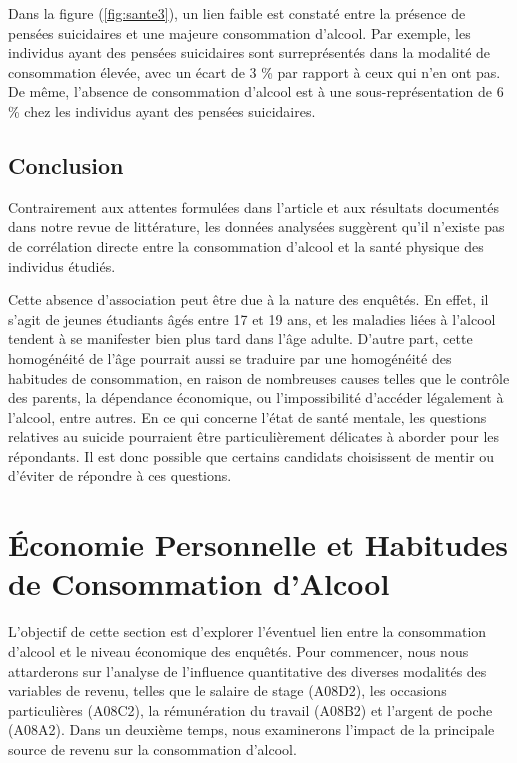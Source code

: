 \documentclass{article}
\begin{document}
Dans la figure (\ref{fig:sante3}), un lien faible est constaté entre la présence de pensées suicidaires et une majeure consommation d'alcool. Par exemple, les individus ayant des pensées suicidaires sont surreprésentés dans la modalité de consommation élevée, avec un écart de 3 \% par rapport à ceux qui n'en ont pas. De même, l'absence de consommation d'alcool est à une sous-représentation de 6 \% chez les individus ayant des pensées suicidaires.



\subsection{Conclusion}

Contrairement aux attentes formulées dans l'article \cite{article1} et aux résultats documentés dans notre revue de littérature, les données analysées suggèrent qu’il n’existe pas de corrélation directe entre la consommation d’alcool et la santé physique des individus étudiés. 

Cette absence d’association peut être due à la nature des enquêtés. En effet, il s'agit de jeunes étudiants âgés entre 17 et 19 ans, et les maladies liées à l'alcool tendent à se manifester bien plus tard dans l'âge adulte. D'autre part, cette homogénéité de l'âge pourrait aussi se traduire par une homogénéité des habitudes de consommation, en raison de nombreuses causes telles que le contrôle des parents, la dépendance économique, ou l'impossibilité d'accéder légalement à l'alcool, entre autres. En ce qui concerne l'état de santé mentale, les questions relatives au suicide pourraient être particulièrement délicates à aborder pour les répondants. Il est donc possible que certains candidats choisissent de mentir ou d'éviter de répondre à ces questions.


\section{Économie Personnelle et Habitudes de Consommation d'Alcool}
L'objectif de cette section est d'explorer l'éventuel lien entre la consommation d'alcool et le niveau économique des enquêtés. Pour commencer, nous nous attarderons sur l'analyse de l'influence quantitative des diverses modalités des variables de revenu, telles que le salaire de stage (A08D2), les occasions particulières (A08C2), la rémunération du travail (A08B2) et l'argent de poche (A08A2). Dans un deuxième temps, nous examinerons l'impact de la principale source de revenu sur la consommation d'alcool.
\end{document}
